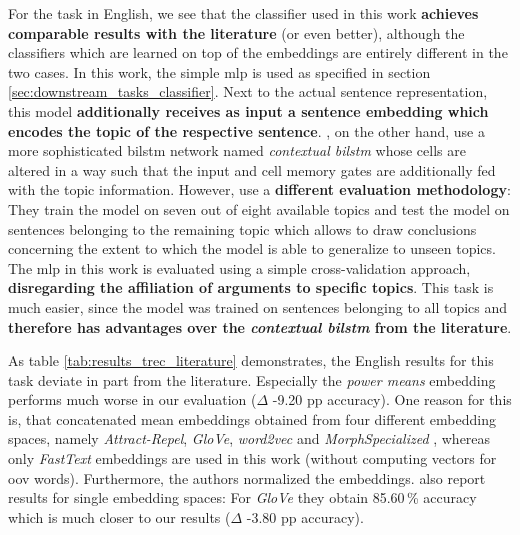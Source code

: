  For the  task in English, we see that the classifier used in this work \textbf{achieves comparable results with the literature} (or even better), although the classifiers which are learned on top of the embeddings are entirely different in the two cases. In this work, the simple \gls{mlp} is used as specified in section \vref{sec:downstream_tasks_classifier}. Next to the actual sentence representation, this model \textbf{additionally receives as input a sentence embedding which encodes the topic of the respective sentence}. \citep{Stab.2018}, on the other hand, use a more sophisticated \gls{bilstm} network named \textit{contextual \gls{bilstm}} whose cells are altered in a way such that the input and cell memory gates are additionally fed with the topic information. However, \citep{Stab.2018} use a \textbf{different evaluation methodology}: They train the model on seven out of eight available topics and test the model on sentences belonging to the remaining topic which allows to draw conclusions concerning the extent to which the model is able to generalize to unseen topics. The \gls{mlp} in this work is evaluated using a simple cross-validation approach, \textbf{disregarding the affiliation of arguments to specific topics}. This task is much easier, since the model was trained on sentences belonging to all topics and \textbf{therefore has advantages over the \textit{contextual \gls{bilstm}} from the literature}. 

 As table \vref{tab:results_trec_literature} demonstrates, the English results for this task deviate in part from the literature. Especially the \textit{power means} embedding performs much worse in our evaluation ($\Delta$ -9.20 pp accuracy). One reason for this is, that \citep{Rueckle.2018} concatenated mean embeddings obtained from four different embedding spaces, namely \textit{Attract-Repel}, \textit{GloVe}, \textit{word2vec} and \textit{MorphSpecialized} \citep{Vulic.2017}, whereas only \textit{FastText} embeddings are used in this work (without computing vectors for \gls{oov} words). Furthermore, the authors normalized the embeddings. \citep{Rueckle.2018} also report results for single embedding spaces: For \textit{GloVe} they obtain 85.60\,\% accuracy which is much closer to our results ($\Delta$ -3.80 pp accuracy).

